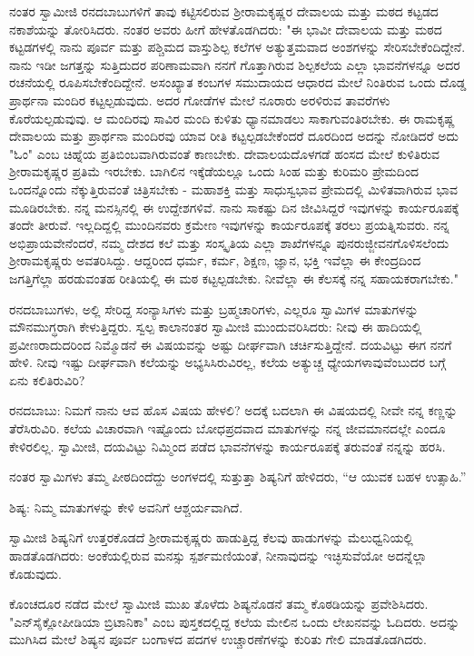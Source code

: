 ನಂತರ ಸ್ವಾಮೀಜಿ ರನದಬಾಬುಗಳಿಗೆ ತಾವು ಕಟ್ಟಿಸಲಿರುವ ಶ‍್ರೀರಾಮಕೃಷ್ಣರ ದೇವಾಲಯ ಮತ್ತು ಮಠದ ಕಟ್ಟಡದ ನಕಾಶೆಯನ್ನು ತೋರಿಸಿದರು. ನಂತರ ಅವರು ಹೀಗೆ ಹೇಳತೊಡಗಿದರು: "ಈ ಭಾವೀ ದೇವಾಲಯ ಮತ್ತು ಮಠದ ಕಟ್ಟಡಗಳಲ್ಲಿ ನಾನು ಪೂರ್ವ ಮತ್ತು ಪಶ್ಚಿಮದ ವಾಸ್ತುಶಿಲ್ಪ ಕಲೆಗಳ ಅತ್ಯುತ್ತಮವಾದ ಅಂಶಗಳನ್ನು ಸೇರಿಸಬೇಕೆಂದಿದ್ದೇನೆ. ನಾನು ಇಡೀ ಜಗತ್ತನ್ನು ಸುತ್ತಿದುದರ ಪರಿಣಾಮವಾಗಿ ನನಗೆ ಗೊತ್ತಾಗಿರುವ ಶಿಲ್ಪಕಲೆಯ ಎಲ್ಲಾ ಭಾವನೆಗಳನ್ನೂ ಅದರ ರಚನೆಯಲ್ಲಿ ರೂಪಿಸಬೇಕೆಂದಿದ್ದೇನೆ. ಅಸಂಖ್ಯಾತ ಕಂಬಗಳ ಸಮುದಾಯದ ಆಧಾರದ ಮೇಲೆ ನಿಂತಿರುವ ಒಂದು ದೊಡ್ಡ ಪ್ರಾರ್ಥನಾ ಮಂದಿರ ಕಟ್ಟಲ್ಪಡುವುದು. ಅದರ ಗೋಡೆಗಳ ಮೇಲೆ ನೂರಾರು ಅರಳಿರುವ ತಾವರೆಗಳು ಕೊರೆಯಲ್ಪಡುವುವು. ಆ ಮಂದಿರವು ಸಾವಿರ ಮಂದಿ ಕುಳಿತು ಧ್ಯಾನಮಾಡಲು ಸಾಕಾಗುವಂತಿರಬೇಕು. ಈ ರಾಮಕೃಷ್ಣ ದೇವಾಲಯ ಮತ್ತು ಪ್ರಾರ್ಥನಾ ಮಂದಿರವು ಯಾವ ರೀತಿ ಕಟ್ಟಲ್ಪಡಬೇಕೆಂದರೆ ದೂರದಿಂದ ಅದನ್ನು ನೋಡಿದರೆ ಅದು "ಓಂ" ಎಂಬ ಚಿಹ್ನೆಯ ಪ್ರತಿಬಿಂಬವಾಗಿರುವಂತೆ ಕಾಣಬೇಕು. ದೇವಾಲಯದೊಳಗಡೆ ಹಂಸದ ಮೇಲೆ ಕುಳಿತಿರುವ ಶ‍್ರೀರಾಮಕೃಷ್ಣರ ಪ್ರತಿಮೆ ಇರಬೇಕು. ಬಾಗಿಲಿನ ಇಕ್ಕೆಡೆಯಲ್ಲೂ ಒಂದು ಸಿಂಹ ಮತ್ತು ಕುರಿಮರಿ ಪ್ರೇಮದಿಂದ ಒಂದನ್ನೊಂದು ನೆಕ್ಕುತ್ತಿರುವಂತೆ ಚಿತ್ರಿಸಬೇಕು - ಮಹಾಶಕ್ತಿ ಮತ್ತು ಸಾಧುಸ್ವಭಾವ ಪ್ರೇಮದಲ್ಲಿ ಮಿಳಿತವಾಗಿರುವ ಭಾವ ಮೂಡಿರಬೇಕು. ನನ್ನ ಮನಸ್ಸಿನಲ್ಲಿ ಈ ಉದ್ದೇಶಗಳಿವೆ. ನಾನು ಸಾಕಷ್ಟು ದಿನ ಜೀವಿಸಿದ್ದರೆ ಇವುಗಳನ್ನು ಕಾರ್ಯರೂಪಕ್ಕೆ ತಂದೇ ತೀರುವೆ. ಇಲ್ಲದಿದ್ದಲ್ಲಿ ಮುಂದಿನವರು ಕ್ರಮೇಣ ಇವುಗಳನ್ನು ಕಾರ್ಯರೂಪಕ್ಕೆ ತರಲು ಪ್ರಯತ್ನಿಸುವರು. ನನ್ನ ಅಭಿಪ್ರಾಯವೇನೆಂದರೆ, ನಮ್ಮ ದೇಶದ ಕಲೆ ಮತ್ತು ಸಂಸ್ಕೃತಿಯ ಎಲ್ಲಾ ಶಾಖೆಗಳನ್ನೂ ಪುನರುಜ್ಜೀವನಗೊಳಿಸಲೆಂದು ಶ‍್ರೀರಾಮಕೃಷ್ಣರು ಅವತರಿಸಿದ್ದು. ಆದ್ದರಿಂದ ಧರ್ಮ, ಕರ್ಮ, ಶಿಕ್ಷಣ, ಜ್ಞಾನ, ಭಕ್ತಿ ಇವೆಲ್ಲಾ ಈ ಕೇಂದ್ರದಿಂದ ಜಗತ್ತಿಗೆಲ್ಲಾ ಹರಡುವಂತಹ ರೀತಿಯಲ್ಲಿ ಈ ಮಠ ಕಟ್ಟಲ್ಪಡಬೇಕು. ನೀವೆಲ್ಲಾ ಈ ಕೆಲಸಕ್ಕೆ ನನ್ನ ಸಹಾಯಕರಾಗಬೇಕು."

ರನದಬಾಬುಗಳು, ಅಲ್ಲಿ ಸೇರಿದ್ದ ಸಂನ್ಯಾಸಿಗಳು ಮತ್ತು ಬ್ರಹ್ಮಚಾರಿಗಳು, ಎಲ್ಲರೂ ಸ್ವಾಮಿಗಳ ಮಾತುಗಳನ್ನು ಮೌನಮುಗ್ಧರಾಗಿ ಕೇಳುತ್ತಿದ್ದರು. ಸ್ವಲ್ಪ ಕಾಲಾನಂತರ ಸ್ವಾಮೀಜಿ ಮುಂದುವರಿಸಿದರು: ನೀವು ಈ ಹಾದಿಯಲ್ಲಿ ಪ್ರವೀಣರಾದುದರಿಂದ ನಿಮ್ಮೊಡನೆ ಈ ವಿಷಯವನ್ನು ಅಷ್ಟು ದೀರ್ಘವಾಗಿ ಚರ್ಚಿಸುತ್ತಿದ್ದೇನೆ. ದಯವಿಟ್ಟು ಈಗ ನನಗೆ ಹೇಳಿ. ನೀವು ಇಷ್ಟು ದೀರ್ಘವಾಗಿ ಕಲೆಯನ್ನು ಅಭ್ಯಸಿಸಿರುವಿರಲ್ಲ, ಕಲೆಯ ಅತ್ಯುಚ್ಚ ಧ್ಯೇಯಗಳಾವುವೆಂಬುದರ ಬಗ್ಗೆ ಏನು ಕಲಿತಿರುವಿರಿ?

ರನದಬಾಬು: ನಿಮಗೆ ನಾನು ಆವ ಹೊಸ ವಿಷಯ ಹೇಳಲಿ? ಅದಕ್ಕೆ ಬದಲಾಗಿ ಈ ವಿಷಯದಲ್ಲಿ ನೀವೇ ನನ್ನ ಕಣ್ಣನ್ನು ತೆರೆಸಿರುವಿರಿ. ಕಲೆಯ ವಿಚಾರವಾಗಿ ಇಷ್ಟೊಂದು ಬೋಧಪ್ರದವಾದ ಮಾತುಗಳನ್ನು ನನ್ನ ಜೀವಮಾನದಲ್ಲೇ ಎಂದೂ ಕೇಳಿರಲಿಲ್ಲ. ಸ್ವಾಮೀಜಿ, ದಯವಿಟ್ಟು ನಿಮ್ಮಿಂದ ಪಡೆದ ಭಾವನೆಗಳನ್ನು ಕಾರ್ಯರೂಪಕ್ಕೆ ತರುವಂತೆ ನನ್ನನ್ನು ಹರಸಿ.

ನಂತರ ಸ್ವಾಮಿಗಳು ತಮ್ಮ ಪೀಠದಿಂದೆದ್ದು ಅಂಗಳದಲ್ಲಿ ಸುತ್ತುತ್ತಾ ಶಿಷ್ಯನಿಗೆ ಹೇಳಿದರು, “ಆ ಯುವಕ ಬಹಳ ಉತ್ಸಾಹಿ.”

ಶಿಷ್ಯ: ನಿಮ್ಮ ಮಾತುಗಳನ್ನು ಕೇಳಿ ಅವನಿಗೆ ಆಶ್ಚರ್ಯವಾಗಿದೆ.

ಸ್ವಾಮೀಜಿ ಶಿಷ್ಯನಿಗೆ ಉತ್ತರಕೊಡದೆ ಶ‍್ರೀರಾಮಕೃಷ್ಣರು ಹಾಡುತ್ತಿದ್ದ ಕೆಲವು ಹಾಡುಗಳನ್ನು ಮೆಲುಧ್ವನಿಯಲ್ಲಿ ಹಾಡತೊಡಗಿದರು: ಅಂಕೆಯಲ್ಲಿರುವ ಮನಸ್ಸು ಸ್ಪರ್ಶಮಣಿಯಂತೆ, ನೀನಾವುದನ್ನು ಇಚ್ಛಿಸುವೆಯೋ ಅದನ್ನೆಲ್ಲಾ ಕೊಡುವುದು.

ಕೊಂಚದೂರ ನಡೆದ ಮೇಲೆ ಸ್ವಾಮೀಜಿ ಮುಖ ತೊಳೆದು ಶಿಷ್ಯನೊಡನೆ ತಮ್ಮ ಕೊಠಡಿಯನ್ನು ಪ್ರವೇಶಿಸಿದರು. "ಎನ್‌ಸೈಕ್ಲೋಪೀಡಿಯಾ ಬ್ರಿಟಾನಿಕಾ" ಎಂಬ ಪುಸ್ತಕದಲ್ಲಿದ್ದ ಕಲೆಯ ಮೇಲಿನ ಒಂದು ಲೇಖನವನ್ನು ಓದಿದರು. ಅದನ್ನು ಮುಗಿಸಿದ ಮೇಲೆ ಶಿಷ್ಯನ ಪೂರ್ವ ಬಂಗಾಳದ ಪದಗಳ ಉಚ್ಚಾರಣೆಗಳನ್ನು ಕುರಿತು ಗೇಲಿ ಮಾಡತೊಡಗಿದರು.

